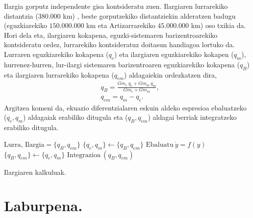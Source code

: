 Ilargia gorputz independente gisa kontsideratu zuen. Ilargiaren lurrarekiko distantzia ($380.000$ km) , beste gorputzekiko distantziekin alderatzen badugu (eguzkiarekiko $150.000.000$ km eta Artizarrarekiko $45.000.000$ km) oso txikia da. Hori dela eta, ilargiaren kokapena, eguzki-sistemaren barizentroarekiko kontsideratu ordez, lurrarekiko kontsideratuz doitasun handiagoa lortuko da. Lurraren eguzkiarekiko kokapena ($q_e$) eta ilargiaren eguzkiarekiko kokapen ($q_m$), hurrenez-hurren, lur-ilargi sistemaren barizentroaren eguzkiarekiko kokapena ($q_B$) eta  ilargiaren lurrarekiko kokapena ($q_{em}$) aldagaiekin ordezkatzen dira,
\begin{align*}
& q_B =\frac{Gm_e \ q_e+Gm_m \ q_m}{Gm_e+Gm_m},\\
& q_{em} =q_m-q_e.
\end{align*}
Argitzea komeni da, ekuazio diferentzialaren eskuin aldeko espresioa ebaluatzeko ($q_e,q_m$) aldagaiak erabiliko ditugula eta ($q_B,q_{em}$) aldagai berriak  integratzeko erabiliko ditugula.

\begin{algorithm}[H]
 \BlankLine
  $\mbox{Lurra, Ilargia}=\{q_B,q_{em}\}$\;
  {
   \BlankLine
     $\{q_e,q_m\} \leftarrow \{q_B,q_{em}\} $\;
     $\mbox{Ebaluatu} \ \dot{y}=f(y)$\;
     $ \{q_B,q_{em}\} \leftarrow \{q_e,q_m\} $\;
     $\mbox{Integrazioa}\ (q_B,q_{em})$\;
   \BlankLine
  }
 \caption{Ilargiaren kalkuluak.}
\end{algorithm}

\begin{table}[h]
\caption{Ilargiaren Lurrarekiko hasierako balioak.}
\label{tab:1}       %
\centering
{}
\end{table}     
          

\section{Laburpena.}

